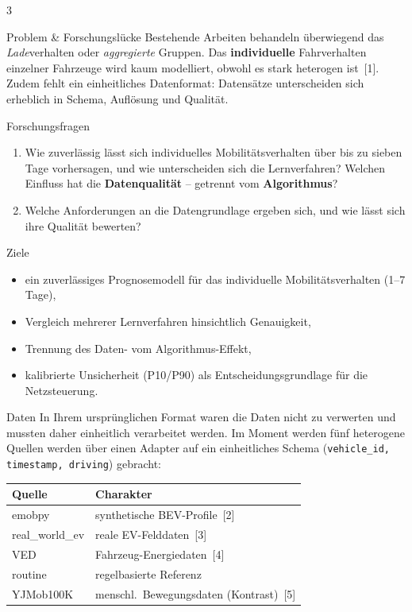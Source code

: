 \documentclass[10pt]{scrartcl}
\begin{document}
\begin{multicols}{3}
\begin{pboxA}{Problem \& Forschungslücke}
Bestehende Arbeiten behandeln überwiegend das \emph{Lade}verhalten oder
\emph{aggregierte} Gruppen. Das \textbf{individuelle} Fahrverhalten einzelner
Fahrzeuge wird kaum modelliert, obwohl es stark heterogen ist~[1]. Zudem fehlt ein einheitliches Datenformat: Datensätze unterscheiden sich erheblich in Schema, Auflösung und Qualität.
\end{pboxA}

\begin{pbox}{Forschungsfragen}
\begin{enumerate}[leftmargin=1.3em,itemsep=0.15em,topsep=0.1em]
  \item Wie zuverlässig lässt sich individuelles Mobilitätsverhalten über bis
        zu sieben Tage vorhersagen, und wie unterscheiden sich die Lernverfahren?
        Welchen Einfluss hat die \textbf{Datenqualität} -- getrennt vom \textbf{Algorithmus}?
  \item Welche Anforderungen an die Datengrundlage ergeben sich, und wie lässt sich ihre Qualität bewerten?
\end{enumerate}
\end{pbox}

\begin{pboxA}{Ziele}
\begin{itemize}[leftmargin=1.2em,itemsep=0.12em,topsep=0.1em]
  \item ein zuverlässiges Prognosemodell für das individuelle Mobilitätsverhalten (1--7 Tage),
  \item Vergleich mehrerer Lernverfahren hinsichtlich Genauigkeit,
  \item Trennung des Daten- vom Algorithmus-Effekt,
  \item kalibrierte Unsicherheit (P10/P90) als Entscheidungsgrundlage für die Netzsteuerung.
\end{itemize}
\end{pboxA}

\begin{pbox}{Daten}
In Ihrem ursprünglichen Format waren die Daten nicht zu verwerten und mussten daher einheitlich verarbeitet werden. Im Moment werden fünf heterogene Quellen werden über einen Adapter auf ein einheitliches Schema (\texttt{vehicle\_id, timestamp, driving}) gebracht:

\vspace{0.2em}
{\footnotesize
\begin{tabularx}{\linewidth}{@{}lX@{}}
\toprule
\textbf{Quelle} & \textbf{Charakter} \\
\midrule
emobpy        & synthetische BEV-Profile~[2] \\
real\_world\_ev & reale EV-Felddaten~[3] \\
VED           & Fahrzeug-Energiedaten~[4] \\
routine       & regelbasierte Referenz \\
YJMob100K     & menschl.\ Bewegungsdaten (Kontrast)~[5] \\
\bottomrule
\end{tabularx}}


\end{pbox}
\end{multicols}
\end{document}
